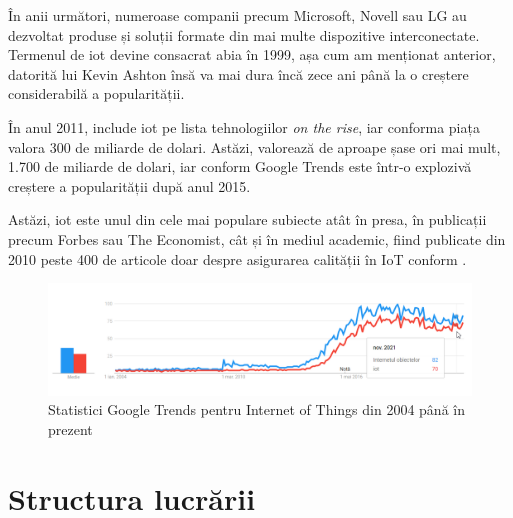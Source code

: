 

În anii următori, numeroase companii precum Microsoft, Novell sau LG au dezvoltat produse și soluții formate din mai multe dispozitive interconectate. Termenul de \acrlong{iot} devine consacrat abia în 1999, așa cum am menționat anterior, datorită lui Kevin Ashton însă va mai dura încă zece ani până la o creștere considerabilă a popularității.

În anul 2011, \citet{Gartner2011} include \acrlong{iot} pe lista tehnologiilor \textit{on the rise}, iar conforma \citet{statistaIot} piața valora 300 de miliarde de dolari. Astăzi, valorează de aproape șase ori mai mult, 1.700 de miliarde de dolari, iar conform Google Trends este într-o explozivă creștere a popularității după anul 2015.

Astăzi, \acrlong{iot} este unul din cele mai populare subiecte atât în presa, în publicații precum Forbes sau The Economist, cât și în mediul academic, fiind publicate din 2010 peste 400 de articole doar despre asigurarea calității în IoT conform \citet{Ahmed2019}.

\begin{figure}[h]
\caption{Statistici Google Trends pentru Internet of Things din 2004 până în prezent}
\centering
\includegraphics[width=\textwidth]{images/trends_iot.png}
\end{figure}


\section{Structura lucrării}

